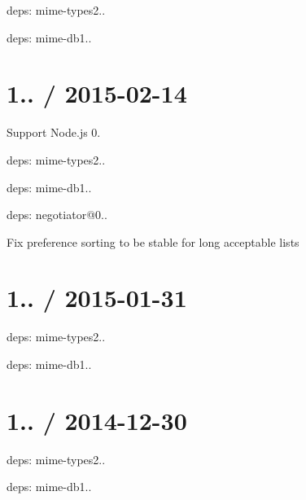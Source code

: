 
\begin{DoxyItemize}
\item deps\+: mime-\/types2..
\begin{DoxyItemize}
\item deps\+: mime-\/db1..
\end{DoxyItemize}
\end{DoxyItemize}

\section*{1.. / 2015-\/02-\/14 }


\begin{DoxyItemize}
\item Support Node.\+js 0.
\item deps\+: mime-\/types2..
\begin{DoxyItemize}
\item deps\+: mime-\/db1..
\end{DoxyItemize}
\item deps\+: negotiator@0..
\begin{DoxyItemize}
\item Fix preference sorting to be stable for long acceptable lists
\end{DoxyItemize}
\end{DoxyItemize}

\section*{1.. / 2015-\/01-\/31 }


\begin{DoxyItemize}
\item deps\+: mime-\/types2..
\begin{DoxyItemize}
\item deps\+: mime-\/db1..
\end{DoxyItemize}
\end{DoxyItemize}

\section*{1.. / 2014-\/12-\/30 }


\begin{DoxyItemize}
\item deps\+: mime-\/types2..
\begin{DoxyItemize}
\item deps\+: mime-\/db1..
\end{DoxyItemize}
\end{DoxyItemize}

